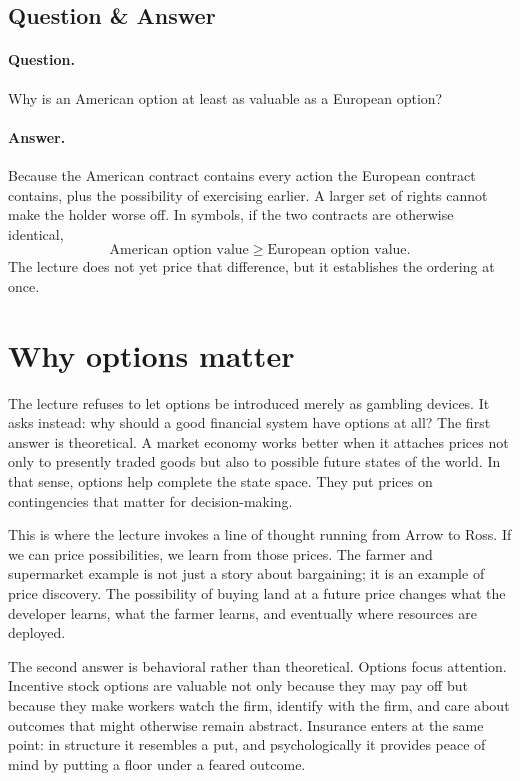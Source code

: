 \subsection{Question \& Answer}

\paragraph{Question.} Why is an American option at least as valuable as a European option?

\paragraph{Answer.} Because the American contract contains every action the European contract contains, plus the possibility of exercising earlier. A larger set of rights cannot make the holder worse off. In symbols, if the two contracts are otherwise identical,
\begin{equation}
\text{American option value} \ge \text{European option value}.
\end{equation}
The lecture does not yet price that difference, but it establishes the ordering at once.

\section{Why options matter}

The lecture refuses to let options be introduced merely as gambling devices. It asks instead: why should a good financial system have options at all? The first answer is theoretical. A market economy works better when it attaches prices not only to presently traded goods but also to possible future states of the world. In that sense, options help complete the state space. They put prices on contingencies that matter for decision-making.

This is where the lecture invokes a line of thought running from Arrow to Ross. If we can price possibilities, we learn from those prices. The farmer and supermarket example is not just a story about bargaining; it is an example of price discovery. The possibility of buying land at a future price changes what the developer learns, what the farmer learns, and eventually where resources are deployed.

The second answer is behavioral rather than theoretical. Options focus attention. Incentive stock options are valuable not only because they may pay off but because they make workers watch the firm, identify with the firm, and care about outcomes that might otherwise remain abstract. Insurance enters at the same point: in structure it resembles a put, and psychologically it provides peace of mind by putting a floor under a feared outcome.


